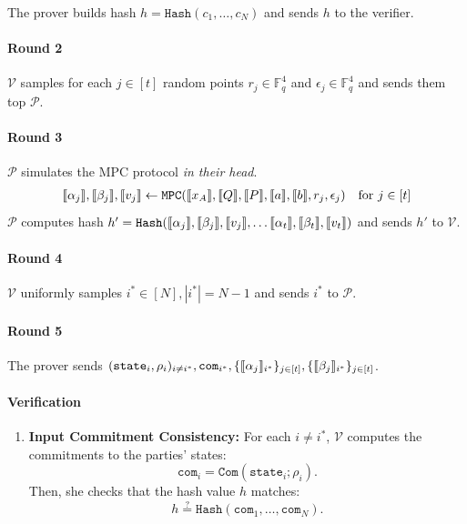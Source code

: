 \documentclass[11pt]{report}
\theoremstyle{definition}
\theoremstyle{plain}
\begin{document}
\begin{protocol}
  \noindent
  The prover builds hash $h = \texttt{Hash}(c_1, \ldots, c_N)$ and sends $h$ to the verifier.

  \paragraph{Round 2} $\mathcal{V}$ samples for each $j \in [t]$ random points $r_j \in \mathbb{F}_q^4$ and $\epsilon_j \in \mathbb{F}_q^4$ and sends them top $\mathcal{P}$.

  \paragraph{Round 3} $\mathcal{P}$ simulates the MPC protocol \textit{in their head}.
  \begin{align*}
    \llbracket \alpha_j \rrbracket, \llbracket \beta_j \rrbracket, \llbracket v_j \rrbracket \leftarrow \texttt{MPC}(\llbracket x_A \rrbracket, \llbracket Q \rrbracket, \llbracket P \rrbracket, \llbracket a \rrbracket, \llbracket b \rrbracket, r_j, \epsilon_j) \quad \text{for }j \in [t]
  \end{align*}
  $\mathcal{P}$ computes hash $h' = \texttt{Hash}(\llbracket \alpha_j \rrbracket, \llbracket \beta_j \rrbracket, \llbracket v_j \rrbracket, \dots \llbracket \alpha_t \rrbracket, \llbracket \beta_t \rrbracket, \llbracket v_t \rrbracket)$ and sends $h'$ to $\mathcal{V}$.

  \paragraph{Round 4} $\mathcal{V}$ uniformly samples $i^* \in [N], |i^*| = N-1$ and sends $i^*$ to $\mathcal{P}$.

  \paragraph{Round 5}
  The prover sends \( (\texttt{state}_i, \rho_i)_{i \neq i^*}, \texttt{com}_{i^*}, \{ \llbracket \alpha_j \rrbracket_{i^*} \}_{j \in [t]}, \{ \llbracket \beta_j \rrbracket_{i^*} \}_{j \in [t]} \).

  \paragraph{Verification}
  \begin{enumerate}
    \item \textbf{Input Commitment Consistency:}
          For each \( i \neq i^* \), $\mathcal{V}$ computes the commitments to the parties' states:
          \[
            \texttt{com}_i = \texttt{Com}(\texttt{state}_i; \rho_i).
          \]
          Then, she checks that the hash value \( h \) matches:
          \[
            h \stackrel{?}{=} \texttt{Hash}(\texttt{com}_1, \dots, \texttt{com}_N).
          \]


\end{enumerate}
\end{protocol}
\end{document}
